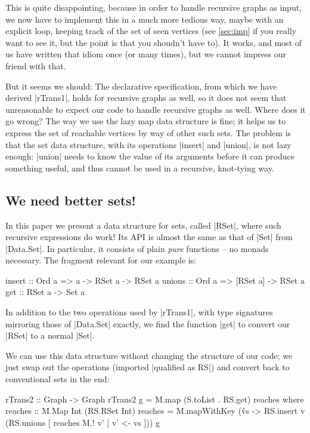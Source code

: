 \documentclass[manuscript,anonymous,screen,acmsmall]{acmart}
\begin{document}
This is quite disappointing, because in order to handle recursive graphs as input, we now have to implement this in a much more tedious way, maybe with an explicit loop, keeping track of the set of seen vertices (see \cref{sec:imp} if you really want to see it, but the point is that you shoudn’t have to). It works, and most of us have written that idiom once (or many times), but we cannot impress our friend with that.

But it seems we should: The declarative specification, from which we have derived |rTrans1|, holds for recursive graphs as well, so it does not seem that unreasonable to expect our code to handle recursive graphs as well. Where does it go wrong? The way we use the lazy map data structure is fine; it helps us to express the set of reachable vertices by way of other such sets.
The problem is that the set data structure, with its operations |insert| and |union|, is not lazy enough: |union| needs to know the value of its arguments before it can produce something useful, and thus cannot be used in a recursive, knot-tying way.

\subsection{We need better sets!}

In this paper we present a data structure for sets, called |RSet|, where such recursive expressions do work! Its API is almost the same as that of |Set| from |Data.Set|. In particular, it consists of plain \emph{pure} functions -- no monads necessary. The fragment relevant for our example is:
\begin{code}
insert  :: Ord a =>  a -> RSet a  -> RSet a
unions  :: Ord a =>  [RSet a]     -> RSet a
get     ::           RSet a       -> Set a
\end{code}
In addition to the two operations used by |rTrans1|, with type signatures mirroring those of |Data.Set| exactly, we find the function |get| to convert our |RSet| to a normal |Set|.

We can use this data structure without changing the structure of our code; we just swap out the operations (imported |qualified as RS|) and convert back to conventional sets in the end:
\begin{code}
rTrans2 :: Graph -> Graph
rTrans2 g = M.map (S.toList . RS.get) reaches
  where
    reaches :: M.Map Int (RS.RSet Int)
    reaches = M.mapWithKey (\v vs -> RS.insert v (RS.unions [ reaches M.! v' | v' <- vs ])) g
\end{code}
\end{document}
